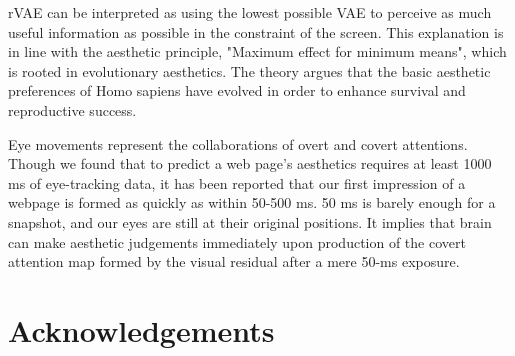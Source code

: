 rVAE can be interpreted as using the lowest possible VAE to perceive as much useful information as possible in the constraint of the screen. This explanation is in line with the aesthetic principle, "Maximum effect for minimum means"\cite{Hekkert2006}, which is rooted in evolutionary aesthetics\cite{Shimamura2012}. The theory argues that the basic aesthetic preferences of Homo sapiens have evolved in order to enhance survival and reproductive success.

Eye movements represent the collaborations of overt and covert attentions. Though we found that to predict a web page's aesthetics requires at least 1000 ms of eye-tracking data, it has been reported that our first impression of a webpage is formed as quickly as within 50-500 ms\cite{Lindgaard2006}. 50 ms is barely enough for a snapshot, and our eyes are still at their original positions. It implies that brain can make aesthetic judgements immediately upon production of the covert attention map formed by the visual residual after a mere 50-ms exposure.

\section{Acknowledgements}



